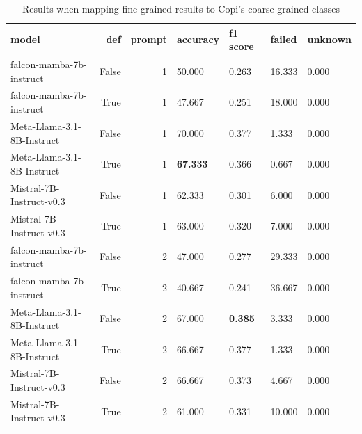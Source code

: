 \begin{table}[H]
\centering
\caption{Results when mapping fine-grained results to Copi's coarse-grained classes}
\begin{tabular}{lrrllll}
\toprule
model & def & prompt & accuracy & f1 score & failed & unknown \\
\midrule
falcon-mamba-7b-instruct & False & 1 & 50.000 & 0.263 & 16.333 & 0.000 \\
falcon-mamba-7b-instruct & True & 1 & 47.667 & 0.251 & 18.000 & 0.000 \\
Meta-Llama-3.1-8B-Instruct & False & 1 & 70.000 & 0.377 & 1.333 & 0.000 \\
Meta-Llama-3.1-8B-Instruct & True & 1 & \textbf{67.333} & 0.366 & 0.667 & 0.000 \\
Mistral-7B-Instruct-v0.3 & False & 1 & 62.333 & 0.301 & 6.000 & 0.000 \\
Mistral-7B-Instruct-v0.3 & True & 1 & 63.000 & 0.320 & 7.000 & 0.000 \\
falcon-mamba-7b-instruct & False & 2 & 47.000 & 0.277 & 29.333 & 0.000 \\
falcon-mamba-7b-instruct & True & 2 & 40.667 & 0.241 & 36.667 & 0.000 \\
Meta-Llama-3.1-8B-Instruct & False & 2 & 67.000 & \textbf{0.385} & 3.333 & 0.000 \\
Meta-Llama-3.1-8B-Instruct & True & 2 & 66.667 & 0.377 & 1.333 & 0.000 \\
Mistral-7B-Instruct-v0.3 & False & 2 & 66.667 & 0.373 & 4.667 & 0.000 \\
Mistral-7B-Instruct-v0.3 & True & 2 & 61.000 & 0.331 & 10.000 & 0.000 \\
\bottomrule
\end{tabular}
\end{table}

